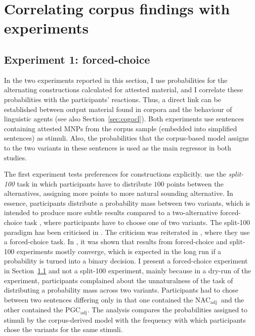 \documentclass[USenglish]{article}
\newcommand{\Sub}[1]{\ensuremath{\mathrm{_{#1}}}}
\newcommand{\NACa}{NAC\Sub{adj}}
\newcommand{\PGCa}{PGC\Sub{adj}}
\begin{document}


\section{Correlating corpus findings with experiments}
\label{sec:experimental}

\subsection{Experiment 1: forced-choice}
\label{sec:exp:fc}

In the two experiments reported in this section, I use probabilities for the alternating constructions calculated for attested material, and I correlate these probabilities with the participants' reactions.
Thus, a direct link can be established between output material found in corpora and the behaviour of linguistic agents (see also Section~\ref{sec:cogocl}).
Both experiments use sentences containing attested MNPs from the corpus sample (embedded into simplified sentences) as stimuli.
Also, the probabilities that the corpus-based model assigns to the two variants in these sentences is used as the main regressor in both studies.

The first experiment tests preferences for constructions explicitly.
\cite{FordBresnan2013} use the \textit{split-100} task in which participants have to distribute $100$ points between the alternatives, assigning more points to more natural sounding alternative.
In essence, participants distribute a probability mass between two variants, which is intended to produce more subtle results compared to a two-alternative forced-choice task \cite{Rosenbach2013}, where participants have to choose one of two variants.
The split-100 paradigm has been criticised in \cite{ArppeJaervikivi2007}.
The criticism was reiterated in \cite{DivjakEa2016}, where they use a forced-choice task.
In \cite{VerhoevenTemme2017}, it was shown that results from forced-choice and split-100 experiments mostly converge, which is expected in the long run if a probability is turned into a binary decision.
I present a forced-choice experiment in Section~\ref{sec:exp:fc} and not a split-100 experiment, mainly because in a dry-run of the experiment, participants complained about the unnaturalness of the task of distributing a probability mass across two variants.
Participants had to chose between two sentences differing only in that one contained the \NACa\ and the other contained the \PGCa.
The analysis compares the probabilities assigned to stimuli by the corpus-derived model with the frequency with which participants chose the variants for the same stimuli.
\end{document}
